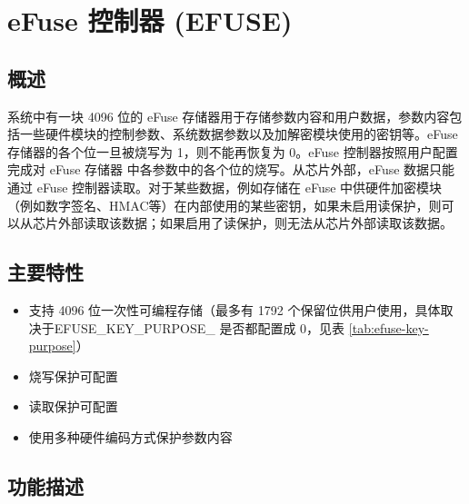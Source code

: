 \documentclass[main\_\_CN.tex]{subfiles}
\begin{document}

\ifglobal
\else
    {\let\clearpage\relax \listoftodos}
    {\let\clearpage\relax \listofdonetodos}
    \tableofcontents
\fi




\section{eFuse 控制器 (EFUSE)}
\label{mod:efuse}
\hypertarget{efuse}{}


\subsection{概述}

\chipname{} 系统中有一块 4096 位的 eFuse 存储器用于存储参数内容和用户数据，参数内容包括一些硬件模块的控制参数、系统数据参数以及加解密模块使用的密钥等。eFuse 存储器的各个位一旦被烧写为 1，则不能再恢复为 0。eFuse 控制器按照用户配置完成对 eFuse 存储器 中各参数中的各个位的烧写。从芯片外部，eFuse 数据只能通过 eFuse 控制器读取。对于某些数据，例如存储在 eFuse 中供硬件加密模块（例如数字签名、HMAC等）在内部使用的某些密钥，如果未启用读保护，则可以从芯片外部读取该数据；如果启用了读保护，则无法从芯片外部读取该数据。

\subsection{主要特性}

\begin{itemize}
    \item 支持 4096 位一次性可编程存储（最多有 1792 个保留位供用户使用，具体取决于EFUSE\_KEY\_PURPOSE\_ 是否都配置成 0，见表 \ref{tab:efuse-key-purpose}）
    \item 烧写保护可配置
    \item 读取保护可配置
    \item 使用多种硬件编码方式保护参数内容
\end{itemize}


\subsection{功能描述}
\end{document}
